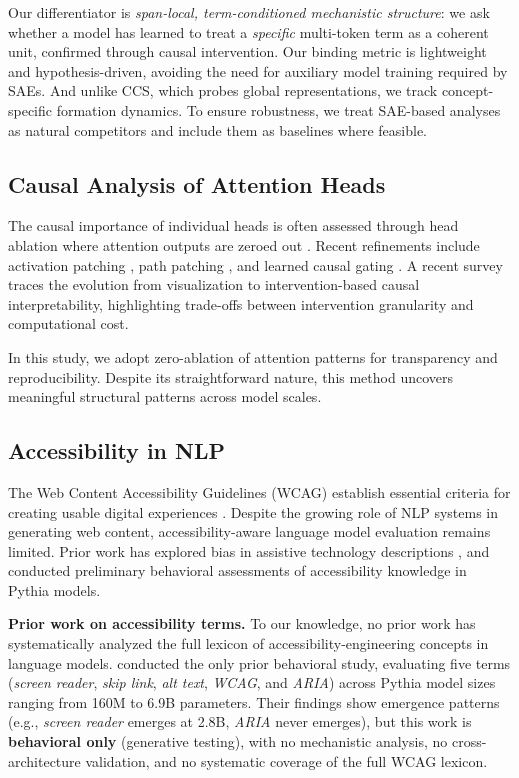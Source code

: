 \documentclass[10pt]{article} %
\begin{document}
Our differentiator is \emph{span-local, term-conditioned mechanistic structure}: we ask whether a model has learned to treat a \emph{specific} multi-token term as a coherent unit, confirmed through causal intervention.
Our binding metric is lightweight and hypothesis-driven, avoiding the need for auxiliary model training required by SAEs.
And unlike CCS, which probes global representations, we track concept-specific formation dynamics.
To ensure robustness, we treat SAE-based analyses as natural competitors and include them as baselines where feasible.

\subsection{Causal Analysis of Attention Heads}

The causal importance of individual heads is often assessed through head ablation where attention outputs are zeroed out \citep{voita2019analyzing,michel2019sixteen}.
Recent refinements include activation patching \citep{meng2022locating,wang2023interpretability}, path patching \citep{goldowsky2023localizing}, and learned causal gating \citep{nam2025causal}.
A recent survey \citep{kadem2026interpreting} traces the evolution from visualization to intervention-based causal interpretability, highlighting trade-offs between intervention granularity and computational cost.

In this study, we adopt zero-ablation of attention patterns for transparency and reproducibility.
Despite its straightforward nature, this method uncovers meaningful structural patterns across model scales.

\subsection{Accessibility in NLP}

The Web Content Accessibility Guidelines (WCAG) establish essential criteria for creating usable digital experiences \citep{w3c2018wcag}.
Despite the growing role of NLP systems in generating web content, accessibility-aware language model evaluation remains limited.
Prior work has explored bias in assistive technology descriptions \citep{trewin2019considerations}, and \citet{salas2026testing} conducted preliminary behavioral assessments of accessibility knowledge in Pythia models.

\textbf{Prior work on accessibility terms.}
To our knowledge, no prior work has systematically analyzed the full lexicon of accessibility-engineering concepts in language models.
\citet{salas2026testing} conducted the only prior behavioral study, evaluating five terms (\textit{screen reader}, \textit{skip link}, \textit{alt text}, \textit{WCAG}, and \textit{ARIA}) across Pythia model sizes ranging from 160M to 6.9B parameters.
Their findings show emergence patterns (e.g., \textit{screen reader} emerges at 2.8B, \textit{ARIA} never emerges), but this work is \textbf{behavioral only} (generative testing), with no mechanistic analysis, no cross-architecture validation, and no systematic coverage of the full WCAG lexicon.
\end{document}
